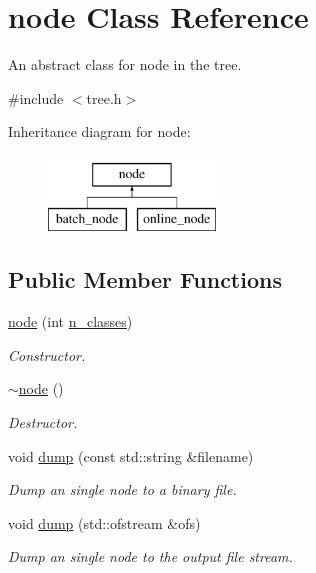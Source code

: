 \hypertarget{classnode}{\section{node Class Reference}
\label{classnode}
}


An abstract class for node in the tree.  




{\ttfamily \#include $<$tree.\+h$>$}

Inheritance diagram for node\+:\begin{figure}[H]
\begin{center}
\leavevmode
\includegraphics[height=2.000000cm]{classnode}
\end{center}
\end{figure}
\subsection*{Public Member Functions}
\begin{DoxyCompactItemize}
\item 
\hyperlink{classnode_a7e5f4a2e917fe20d91d75faf2e9ba5de}{node} (int \hyperlink{classnode_a8c4864582cb3fe15e84e7908d0965150}{n\+\_\+classes})
\begin{DoxyCompactList}\small\item\em Constructor. \end{DoxyCompactList}\item 
\hyperlink{classnode_a482f83436a89f09d289b26144d817adf}{$\sim$node} ()
\begin{DoxyCompactList}\small\item\em Destructor. \end{DoxyCompactList}\item 
void \hyperlink{classnode_a873438b420d0f6d2659a1b25875ed300}{dump} (const std\+::string \&filename)
\begin{DoxyCompactList}\small\item\em Dump an single node to a binary file. \end{DoxyCompactList}\item 
void \hyperlink{classnode_acab00fde3bcc5d44044c39a37313b4eb}{dump} (std\+::ofstream \&ofs)
\begin{DoxyCompactList}\small\item\em Dump an single node to the output file stream. \end{DoxyCompactList}\end{DoxyCompactItemize}
